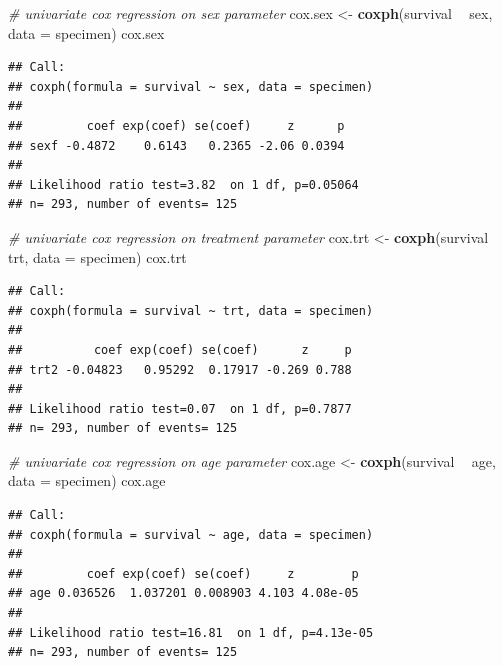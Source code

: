 \documentclass[]{article}
\newenvironment{Shaded}{\begin{snugshade}}{\end{snugshade}}
\newcommand{\KeywordTok}[1]{\textcolor[rgb]{0.13,0.29,0.53}{\textbf{#1}}}
\newcommand{\DataTypeTok}[1]{\textcolor[rgb]{0.13,0.29,0.53}{#1}}
\newcommand{\StringTok}[1]{\textcolor[rgb]{0.31,0.60,0.02}{#1}}
\newcommand{\CommentTok}[1]{\textcolor[rgb]{0.56,0.35,0.01}{\textit{#1}}}
\newcommand{\OperatorTok}[1]{\textcolor[rgb]{0.81,0.36,0.00}{\textbf{#1}}}
\newcommand{\NormalTok}[1]{#1}
\begin{document}
\begin{Shaded}
\begin{Highlighting}[]
\CommentTok{# univariate cox regression on sex parameter}
\NormalTok{cox.sex <-}\StringTok{ }\KeywordTok{coxph}\NormalTok{(survival }\OperatorTok{~}\StringTok{ }\NormalTok{sex, }\DataTypeTok{data =}\NormalTok{ specimen)}
\NormalTok{cox.sex}
\end{Highlighting}
\end{Shaded}

\begin{verbatim}
## Call:
## coxph(formula = survival ~ sex, data = specimen)
## 
##         coef exp(coef) se(coef)     z      p
## sexf -0.4872    0.6143   0.2365 -2.06 0.0394
## 
## Likelihood ratio test=3.82  on 1 df, p=0.05064
## n= 293, number of events= 125
\end{verbatim}

\begin{Shaded}
\begin{Highlighting}[]
\CommentTok{# univariate cox regression on treatment parameter}
\NormalTok{cox.trt <-}\StringTok{ }\KeywordTok{coxph}\NormalTok{(survival }\OperatorTok{~}\StringTok{ }\NormalTok{trt, }\DataTypeTok{data =}\NormalTok{ specimen)}
\NormalTok{cox.trt}
\end{Highlighting}
\end{Shaded}

\begin{verbatim}
## Call:
## coxph(formula = survival ~ trt, data = specimen)
## 
##          coef exp(coef) se(coef)      z     p
## trt2 -0.04823   0.95292  0.17917 -0.269 0.788
## 
## Likelihood ratio test=0.07  on 1 df, p=0.7877
## n= 293, number of events= 125
\end{verbatim}

\begin{Shaded}
\begin{Highlighting}[]
\CommentTok{# univariate cox regression on age parameter}
\NormalTok{cox.age <-}\StringTok{ }\KeywordTok{coxph}\NormalTok{(survival }\OperatorTok{~}\StringTok{ }\NormalTok{age, }\DataTypeTok{data =}\NormalTok{ specimen)}
\NormalTok{cox.age}
\end{Highlighting}
\end{Shaded}

\begin{verbatim}
## Call:
## coxph(formula = survival ~ age, data = specimen)
## 
##         coef exp(coef) se(coef)     z        p
## age 0.036526  1.037201 0.008903 4.103 4.08e-05
## 
## Likelihood ratio test=16.81  on 1 df, p=4.13e-05
## n= 293, number of events= 125
\end{verbatim}
\end{document}

